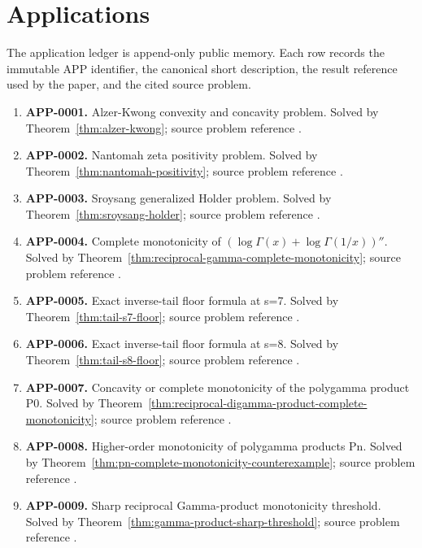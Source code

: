 \documentclass[11pt]{article}
\numberwithin{equation}{section}
\theoremstyle{definition}
\theoremstyle{remark}
\newcommand{\1}{\mathbf 1}
\begin{document}
\section{Applications}
\label{sec:applications}
The application ledger is append-only public memory.  Each row records the immutable APP identifier, the canonical short description, the result reference used by the paper, and the cited source problem.
\begin{enumerate}
\item \label{ledger:app-0001}\textbf{APP-0001.} Alzer-Kwong convexity and concavity problem. Solved by Theorem~\ref{thm:alzer-kwong}; source problem reference \cite{app-app-0001-source}.
\item \label{ledger:app-0002}\textbf{APP-0002.} Nantomah zeta positivity problem. Solved by Theorem~\ref{thm:nantomah-positivity}; source problem reference \cite{nantomah}.
\item \label{ledger:app-0003}\textbf{APP-0003.} Sroysang generalized Holder problem. Solved by Theorem~\ref{thm:sroysang-holder}; source problem reference \cite{sroysang}.
\item \label{ledger:app-0004}\textbf{APP-0004.} Complete monotonicity of \((\log\Gamma(x)+\log\Gamma(1/x))''\). Solved by Theorem~\ref{thm:reciprocal-gamma-complete-monotonicity}; source problem reference \cite{app-app-0004-source}.
\item \label{ledger:app-0005}\textbf{APP-0005.} Exact inverse-tail floor formula at s=7. Solved by Theorem~\ref{thm:tail-s7-floor}; source problem reference \cite{kim-song-tail}.
\item \label{ledger:app-0006}\textbf{APP-0006.} Exact inverse-tail floor formula at s=8. Solved by Theorem~\ref{thm:tail-s8-floor}; source problem reference \cite{kim-song-tail}.
\item \label{ledger:app-0007}\textbf{APP-0007.} Concavity or complete monotonicity of the polygamma product P0. Solved by Theorem~\ref{thm:reciprocal-digamma-product-complete-monotonicity}; source problem reference \cite{app-app-0004-source}.
\item \label{ledger:app-0008}\textbf{APP-0008.} Higher-order monotonicity of polygamma products Pn. Solved by Theorem~\ref{thm:pn-complete-monotonicity-counterexample}; source problem reference \cite{app-app-0004-source}.
\item \label{ledger:app-0009}\textbf{APP-0009.} Sharp reciprocal Gamma-product monotonicity threshold. Solved by Theorem~\ref{thm:gamma-product-sharp-threshold}; source problem reference \cite{app-app-0009-source}.

\end{enumerate}
\end{document}
